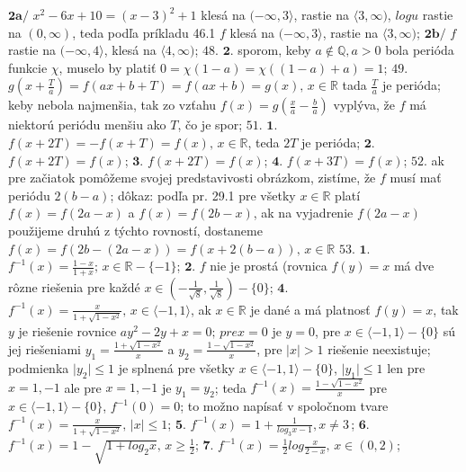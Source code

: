 $\boldsymbol{2a/}$
$ x^{2}-6x+10=(x-3)^{2}+1  $ klesá na $ (-\infty,3 \rangle $, rastie na $ \langle3, \infty) $, $log u $ rastie na   $(0, \infty) $, teda podľa príkladu 46.1 $ f $ klesá na $ (-\infty,3 \rangle $, rastie na $ \langle3, \infty) $;
$\boldsymbol{2b/}$
$ f $ rastie na $ (-\infty,4 \rangle $, klesá na  $ \langle4, \infty) $;
$\boxed{48.}$
$\boldsymbol{2.}$
sporom, keby $ a \notin \mathbb{Q}, a>0 $ bola perióda funkcie $ \chi $, muselo by platiť $ 0=\chi(1-a)= \chi((1-a)+a)=1 $;
$\boxed{49.}$
$ g(x+ \frac{T}{a})=f(ax+b+T)=f(ax+b)=g(x), \, x \in \mathbb{R} $ tada $ \frac{T}{a} $ je perióda; keby nebola najmenšia, tak zo vzťahu $f(x)=g(\frac{x}{a}-\frac{b}{a}) $  vyplýva, že $ f $ má niektorú periódu menšiu ako $ T $, čo je spor;
$\boxed{51.}$
$\boldsymbol{1.}$
$ f(x+2T)=-f(x+T)=f(x), \, x\in \mathbb{R} $,  teda $ 2T $ je perióda;
$\boldsymbol{2.}$
$ f(x+2T)=f(x) $;
$\boldsymbol{3.}$
$ f(x+2T)=f(x) $;
$\boldsymbol{4.}$
$ f(x+3T)=f(x) $;
$\boxed{52.}$
ak pre začiatok pomôžeme svojej predstavivosti obrázkom, zistíme, že $ f $ musí mať periódu $ 2(b-a) $; dôkaz: podľa pr. 29.1 pre všetky $ x \in \mathbb{R} $  platí $ f(x)=f(2a-x) $ a $ f(x)=f(2b-x) $, ak na vyjadrenie $ f(2a-x) $ použijeme druhú z týchto rovností, dostaneme $ f(x)=f(2b-(2a-x))=f(x+2(b-a)), \, x \in \mathbb{R} $
$\boxed{53.}$
$\boldsymbol{1.}$
$ f^{-1}(x)= \frac{1-x}{1+x}; \, x \in \mathbb{R}-\lbrace-1\rbrace $;
$\boldsymbol{2.}$
$ f $ nie je prostá (rovnica $ f(y)=x $ má dve rôzne riešenia pre každé $ x \in (- \frac{1}{\sqrt{8}}, \frac{1}{\sqrt{8}}) - \lbrace 0 \rbrace $;
$\boldsymbol{4.}$
$ f^{-1}(x)=\frac{x}{1+\sqrt{1-x^{2}}}, \, x \in \langle-1,1\rangle $, 
ak $ x \in \mathbb{R} $ je dané a má platnosť $ f(y)=x $, tak $ y $ je riešenie rovnice $ ay^{2}-2y+x=0; \, pre x=0 $ je 
$ y=0 $, pre $ x \in \langle -1,1 \rangle - \lbrace 0 \rbrace $ sú jej riešeniami $ y_{1}= \frac{1+\sqrt{1-x^{2}}}{x} $ a  $ y_{2}= \frac{1-\sqrt{1-x^{2}}}{x} $, pre $ \vert x\vert > 1$ riešenie neexistuje; podmienka $ \vert y_{2} \vert \leq 1 $ je splnená pre všetky 
$ x \in \langle -1,1 \rangle - \lbrace 0 \rbrace $, $ \vert y_{1} \vert \leq 1  $ len pre 
$ x=1,-1 $ ale  pre  $ x=1,-1 $ je $ y _{1} = y_{2} $;
teda $ f^{-1}(x)=\frac{1-\sqrt{1-x^{2}}}{x} $ pre $ x \in \langle -1,1 \rangle - \lbrace 0 \rbrace $, $ f^{-1}(0)=0 $; to možno napísať v spoločnom tvare $ f^{-1}(x) = \frac{x}{1+ \sqrt{1-x^{2}}}, \, \vert x \vert \leq 1 $;
$\boldsymbol{5.}$
$ f^{-1}(x) = 1+\frac{1}{log_{3}x -1},x \ne 3 \,  $;
$\boldsymbol{6.}$
$ f^{-1}(x)=1- \sqrt{1+log_{2}x}, \, x\geq \frac{1}{2} $;
$\boldsymbol{7.}$
$ f^{-1}(x)= \frac{1}{2} log \frac{x}{2-x}, \, x \in (0,2) $;
